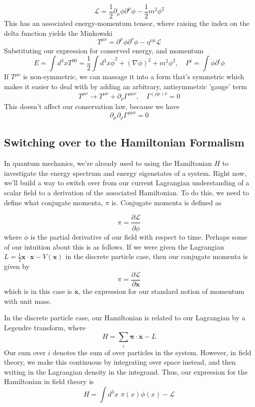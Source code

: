 \documentclass[11pt, oneside]{article}   	%
\theoremstyle{newline}
\theoremstyle{newline}
\theoremstyle{newline}
\theoremstyle{newline}
\theoremstyle{newline}
\begin{document}
\[ 
\mathcal{L}  = \frac{1}{ 2} \partial_\mu \phi \partial^\mu \phi  - \frac{1} {2}  m^2 \phi^2 
\] 
This has an associated energy-momentum tensor, where raising the index on the delta function yields the Minkowski 
\[ 	
T^{\mu\nu}  = \partial^\mu \phi \partial^\nu \phi  - \eta^{\nu\mu} \mathcal{L } 
\]
Substituting our expression for conserved energy, and momentum 
\[ 
E = \int d^3 x T^{00}  =  \frac{1}{ 2}  \int d^3 x \dot{\phi}^2 + (\nabla \phi)^2 + m^2 \phi^2, \quad P^i  = \int \dot{\phi} \partial^i \phi 
\] 
If $T^{ \mu \nu }$ is non-symmetric, we can massage it into a form that's symmetric which makes it easier to deal with by adding an arbitrary, antisymmetric 'gauge' term 
\[ 
T^{\mu \nu} \rightarrow T^{\mu \nu} + \partial_\rho \Gamma^{ \rho \mu \nu}, \quad  \Gamma^{(\rho \mu) \nu }  = 0
\] This doesn't affect our conservation law, because we have
\[ 
\partial_\mu \partial_\rho \Gamma^{\rho \mu \nu} = 0 
\] 


\subsection{Switching over to the Hamiltonian Formalism} 
In quantum mechanics, we're already used to using the Hamiltonian $H$ to investigate the energy spectrum and energy eigenstates of a system. Right now, we'll build a way to switch over from our current Lagrangian understanding of a scalar field to a derivation of the associated Hamiltonian. To do this, we need to define what conjugate momenta, $ \pi $ is. Conjugate momenta is defined as 

\[ \pi  = \frac{ \partial \mathcal{L} } { \partial \dot{ \phi} } \] 
where $\dot{ \phi } $ is the partial derivative of our field with respect to time. Perhaps some of our intuition about this is as follows. If we were given the Lagrangian $L = \frac{ 1}{ 2} \mathbf{ x} \cdot \mathbf{ x}  - V ( \mathbf{ x} ) $ in the discrete particle case, then our conjugate momenta is given by \[ \pi = \frac{ \partial \mathcal{ L } }{ \partial \dot{\mathbf{x}}} \] which is in this case is $ \dot{\mathbf{x}} $, the expression for our standard notion of momentum with unit mass. 

In the discrete particle case, our Hamiltonian is related to our Lagrangian by a Legendre transform, where \[ 
H = \sum_i \mathbf{\pi} \cdot  \dot{ \mathbf{ x}} - L \] Our sum over $i$ 
denotes the sum of over particles in the system. However, in field theory, we make this continuous by integrating over space instead, and then writing in the Lagrangian density in the integrand. Thus, our expression for the Hamiltonian in field theory is \[ H = \int d^3 x \, \, \pi( x) \phi(x)  - \mathcal{ L } \] 
\end{document}
